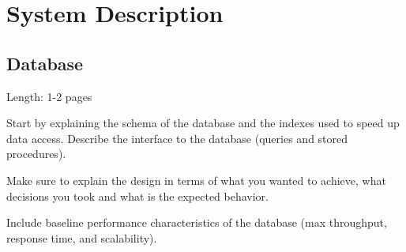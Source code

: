 \documentclass[11pt]{article}
\begin{document}
\maketitle

\newpage

\section{System Description}\label{sec:system-description}

\subsection{Database}\label{sec:database}

Length: 1-2 pages

Start by explaining the schema of the database and the indexes used to
speed up data access. Describe the interface to the database (queries
and stored procedures).

Make sure to explain the design in terms of what you wanted to achieve,
what decisions you took and what is the expected behavior.

Include baseline performance characteristics of the database (max
throughput, response time, and scalability).
\end{document}
